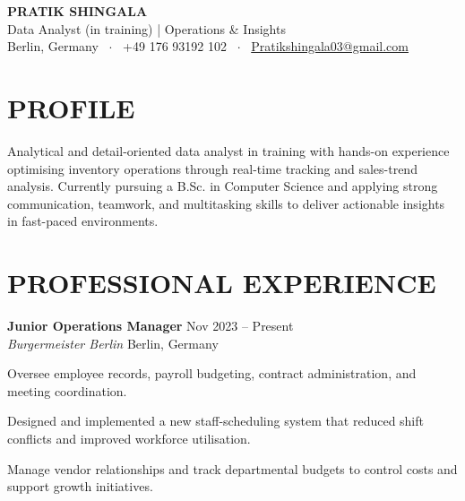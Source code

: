 \documentclass[10pt, letterpaper]{article}
\begin{document}
\color{textColor}

\begin{center}
    {\LARGE \bfseries \color{primaryColor} PRATIK SHINGALA} \\ \vspace{4pt}
    Data Analyst (in training) | Operations \& Insights \\ \vspace{6pt}
    \small 
    Berlin, Germany \ $\cdot$ \ 
    +49 176 93192 102 \ $\cdot$ \ 
    \href{mailto:Pratikshingala03@gmail.com}{Pratikshingala03@gmail.com}
\end{center}

\section*{PROFILE}
\vspace{2pt}
Analytical and detail-oriented data analyst in training with hands-on experience optimising inventory operations through real-time tracking and sales-trend analysis. Currently pursuing a B.Sc. in Computer Science and applying strong communication, teamwork, and multitasking skills to deliver actionable insights in fast-paced environments.

\section*{PROFESSIONAL EXPERIENCE}

\vspace{4pt}
\textbf{Junior Operations Manager} \hfill Nov 2023 -- Present \\
\textit{Burgermeister Berlin} \hfill Berlin, Germany
\begin{cvitems}
    \item Oversee employee records, payroll budgeting, contract administration, and meeting coordination.
    \item Designed and implemented a new staff-scheduling system that reduced shift conflicts and improved workforce utilisation.
    \item Manage vendor relationships and track departmental budgets to control costs and support growth initiatives.
\end{cvitems}
\end{document}
